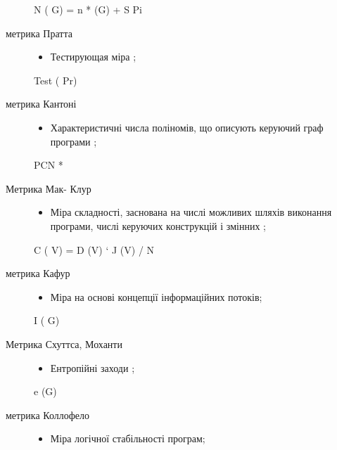 \begin{description}
\begin{itemize}
\end{itemize}

N ( G) = n * (G) + S Pi

\item[{метрика Пратта}] \leavevmode\begin{itemize}
\item {} 
Тестирующая міра ;

\end{itemize}

Test ( Pr)

\item[{метрика Кантоні}] \leavevmode\begin{itemize}
\item {} 
Характеристичні числа поліномів, що описують керуючий граф програми ;

\end{itemize}

PCN *

\item[{Метрика Мак- Клур}] \leavevmode\begin{itemize}
\item {} 
Міра складності, заснована на числі можливих шляхів виконання програми, числі керуючих конструкцій і змінних ;

\end{itemize}

C ( V) = D (V) ` J (V) / N

\item[{метрика Кафур}] \leavevmode\begin{itemize}
\item {} 
Міра на основі концепції інформаційних потоків;

\end{itemize}

I ( G)

\item[{Метрика Схуттса, Моханти}] \leavevmode\begin{itemize}
\item {} 
Ентропійні заходи ;

\end{itemize}

e (G)

\item[{метрика Коллофело}] \leavevmode\begin{itemize}
\item {} 
Міра логічної стабільності програм;

\end{itemize}


\end{description}

